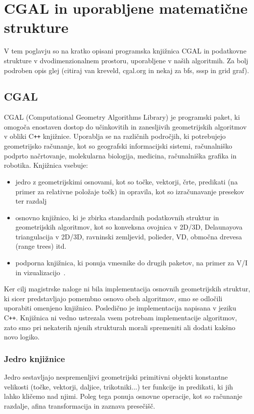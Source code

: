 \documentclass[a4paper, 12pt]{book}
\newcommand{\clearemptydoublepage}{\newpage{\pagestyle{empty}\cleardoublepage}}
\begin{document}
\clearemptydoublepage


\chapter{CGAL in uporabljene matematične strukture}
\label{ch1}

V tem poglavju so na kratko opisani programska knjižnica CGAL in podatkovne strukture v dvodimenzionalnem prostoru, uporabljene v naših algoritmih. Za bolj podroben opis glej (citiraj van kreveld, cgal.org in nekaj za bfs, sssp in grid graf).
\section{CGAL}
CGAL (Computational Geometry Algorithms Library) je programski paket, ki omogoča enostaven dostop do učinkovitih in zanesljivih geometrijskih algoritmov v obliki C\texttt{+}\texttt{+} knjižnice. Uporablja se na različnih področjih, ki potrebujejo geometrijsko računanje, kot so geografski informacijski sistemi, računalniško podprto načrtovanje, molekularna biologija, medicina, računalniška grafika in robotika. Knjižnica vsebuje:

\begin{itemize}
\item jedro z geometrijskimi osnovami, kot so točke, vektorji, črte, predikati (na primer za relativne položaje točk) in opravila, kot so izračunavanje presekov ter razdalj
\item osnovno knjižnico, ki je zbirka standardnih podatkovnih struktur in geometrijskih algoritmov, kot so konveksna ovojnica v 2D/3D, Delaunayova triangulacija v 2D/3D, ravninski zemljevid, polieder, VD, območna drevesa (range trees) itd.
\item podporna knjižnica, ki ponuja vmesnike do drugih paketov, na primer za V/I in vizualizacijo~\cite{cgal:bfghhkps-lgk23-16b}.
\end{itemize}

Ker cilj magistrske naloge ni bila implementacija osnovnih geometrijskih struktur, ki sicer predstavljajo pomembno osnovo obeh algoritmov, smo se odločili uporabiti omenjeno knjižnico. Posledično je implementacija napisana v jeziku C\texttt{+}\texttt{+}. Knjižnica ni vedno ustrezala vsem potrebam implementacije algoritmov, zato smo pri nekaterih njenih strukturah morali spremeniti ali dodati kakšno novo logiko. 

\subsection{Jedro knjižnice}
Jedro sestavljajo nespremenljivi geometrijski primitivni objekti konstantne velikosti (točke, vektorji, daljice, trikotniki...) ter funkcije in predikati, ki jih lahko kličemo nad njimi. Poleg tega ponuja osnovne operacije, kot so računanje razdalje, afina transformacija in zaznava presečišč. 
\end{document}
